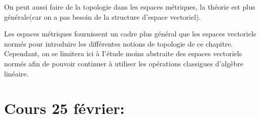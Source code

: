 \documentclass{article}
\begin{document}
\begin{tcolorbox}[colback=yellow!5!white,colframe=yellow!75!black,title=Remarque 1.3]

On peut aussi faire de la topologie dans les espaces métriques, la théorie est plus générale(car on a pas besoin de la structure d'espace vectoriel).

\tcblower
Les espaces métriques fournissent un cadre plus général que les espaces vectoriels normés pour introduire les différentes notions de topologie de ce chapitre. Cependant, on se limitera ici à I'étude moins abstraite des espaces vectoriels normés afin de pouvoir continuer à utiliser les opérations classigues d'algèbre linéaire.


\end{tcolorbox}





\section{Cours 25 février: }
\end{document}
